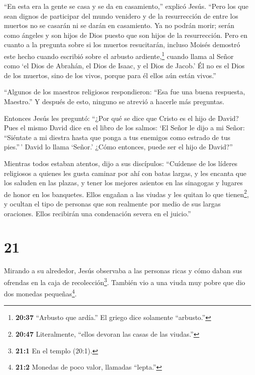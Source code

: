  ``En esta era la gente se casa y se da en casamiento,''
explicó Jesús.  ``Pero los que sean dignos de participar
del mundo venidero y de la resurrección de entre los muertos no se
casarán ni se darán en casamiento.  Ya no podrán morir;
serán como ángeles y son hijos de Dios puesto que son hijos de la
resurrección.  Pero en cuanto a la pregunta sobre si los
muertos resucitarán, incluso Moisés demostró este hecho cuando escribió
sobre el arbusto ardiente,\footnote{\textbf{20:37} ``Arbusto que
  ardía.'' El griego dice solamente ``arbusto.''} cuando llama al Señor
como `el Dios de Abrahán, el Dios de Isaac, y el Dios de Jacob.'
 Él no es el Dios de los muertos, sino de los vivos, porque
para él ellos aún están vivos.''

 ``Algunos de los maestros religiosos respondieron: ``Esa
fue una buena respuesta, Maestro.''  Y después de esto,
ninguno se atrevió a hacerle más preguntas.

 Entonces Jesús les preguntó: ``¿Por qué se dice que Cristo
es el hijo de David?  Pues el mismo David dice en el libro
de los salmos: `El Señor le dijo a mi Señor: ``Siéntate a mi diestra
 hasta que ponga a tus enemigos como estrado de tus
pies.''\,'  David lo llama `Señor.' ¿Cómo entonces, puede
ser el hijo de David?''

 Mientras todos estaban atentos, dijo a sus discípulos:
 ``Cuídense de los líderes religiosos a quienes les gusta
caminar por ahí con batas largas, y les encanta que los saluden en las
plazas, y tener los mejores asientos en las sinagogas y lugares de honor
en los banquetes.  Ellos engañan a las viudas y les quitan
lo que tienen\footnote{\textbf{20:47} Literalmente, ``ellos devoran las
  casas de las viudas.''}, y ocultan el tipo de personas que son
realmente por medio de sus largas oraciones. Ellos recibirán una
condenación severa en el juicio.''

\hypertarget{section-20}{%
\section{21}\label{section-20}}

 Mirando a su alrededor, Jesús observaba a las personas
ricas y cómo daban sus ofrendas en la caja de recolección\footnote{\textbf{21:1}
  En el templo (20:1).}.  También vio a una viuda muy pobre
que dio dos monedas pequeñas\footnote{\textbf{21:2} Monedas de poco
  valor, llamadas ``lepta.''}.

